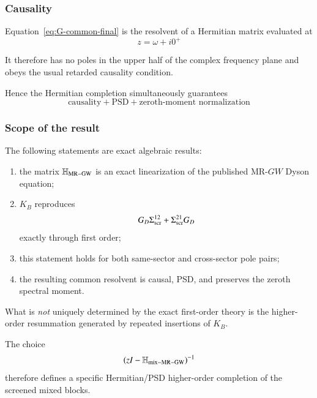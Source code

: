 \documentclass[aip,jcp,reprint,noshowkeys,superscriptaddress]{revtex4-1}
\begin{document}
\subsubsection{Causality}

Equation~\eqref{eq:G-common-final} is the resolvent of a Hermitian
matrix evaluated at
\begin{equation}
  z=\omega+i0^+
\end{equation}

It therefore has no poles in the upper half of the complex frequency
plane and obeys the usual retarded causality condition.

Hence the Hermitian completion simultaneously guarantees
\begin{equation}
  \text{causality}
  +
  \text{PSD}
  +
  \text{zeroth-moment normalization}
\end{equation}


\subsubsection{Scope of the result}

The following statements are exact algebraic results:

\begin{enumerate}
  \item the matrix $\mathbb H_{\rm MR-GW}$ is an exact linearization of
  the published MR-$GW$ Dyson equation;
  \item $K_B$ reproduces
  \begin{equation}
    G_D\Sigma_{\rm scr}^{12}
    +
    \Sigma_{\rm scr}^{21}G_D
  \end{equation}
  exactly through first order;
  \item this statement holds for both same-sector and cross-sector
  pole pairs;
  \item the resulting common resolvent is causal, PSD, and preserves
  the zeroth spectral moment.
\end{enumerate}

What is \emph{not} uniquely determined by the exact first-order theory
is the higher-order resummation generated by repeated insertions of
$K_B$.

The choice
\begin{equation}
  \left(
    zI-\mathbb H_{\rm mix-MR-GW}
  \right)^{-1}
\end{equation}
therefore defines a specific Hermitian/PSD higher-order completion of
the screened mixed blocks.
\end{document}

